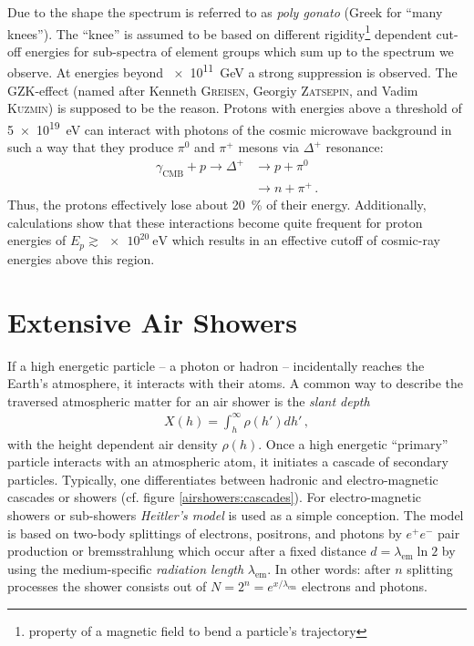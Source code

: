 Due to the shape the spectrum is referred to as \textit{poly gonato} (Greek for \enquote{many knees}). The \enquote{knee} is assumed to be based on different rigidity\footnote{property of a magnetic field to bend a particle's trajectory} dependent cut-off energies for sub-spectra of element groups which sum up to the spectrum we observe. \cite{cosmicrays:hoerandel, cosmicrays:shapiro} At energies beyond \SI{e11}{\giga\electronvolt} a strong suppression is observed. The GZK-effect (named after Kenneth \textsc{Greisen}, Georgiy \textsc{Zatsepin}, and Vadim \textsc{Kuzmin}) is supposed to be the reason. Protons with energies above a threshold of \SI{5e19}{\electronvolt} can interact with photons of the cosmic microwave background in such a way that they produce $\pi^0$ and $\pi^+$ mesons via $\Delta^+$ resonance:
\begin{subequations}
	\begin{align}
	\gamma_\text{CMB} + p \rightarrow \Delta^+ &\rightarrow p + \pi^0\\
	&\rightarrow n + \pi^+\,.
	\end{align}
\end{subequations}
Thus, the protons effectively lose about \SI{20}{\percent} of their energy. Additionally, calculations show that these interactions become quite frequent for proton energies of $E_p\gtrsim\SI{e20}{\electronvolt}$ which results in an effective cutoff of cosmic-ray energies above this region. \cite{cosmicrays:gzk}

\section{Extensive Air Showers}

If a high energetic particle -- a photon or hadron -- incidentally reaches the Earth's atmosphere, it interacts with their atoms. A common way to describe the traversed atmospheric matter for an air shower is the \textit{slant depth}
\begin{align}
X(h) = \int_{h}^{\infty}\rho(h')dh'\,,
\end{align}
with the height dependent air density $\rho(h)$. Once a high energetic \enquote{primary} particle interacts with an atmospheric atom, it initiates a cascade of secondary particles. Typically, one differentiates between hadronic and electro-magnetic cascades or showers (cf. figure \ref{airshowers:cascades}). For electro-magnetic showers or sub-showers \textit{Heitler's model} is used as a simple conception. The model is based on two-body splittings of electrons, positrons, and photons by $e^+ e^-$ pair production or bremsstrahlung which occur after a fixed distance $d=\lambda_\text{em}\ln{2}$ by using the medium-specific \textit{radiation length} $\lambda_\text{em}$. In other words: after $n$ splitting processes the shower consists out of $N = 2^n = e^{x/\lambda_\text{em}}$ electrons and photons.

